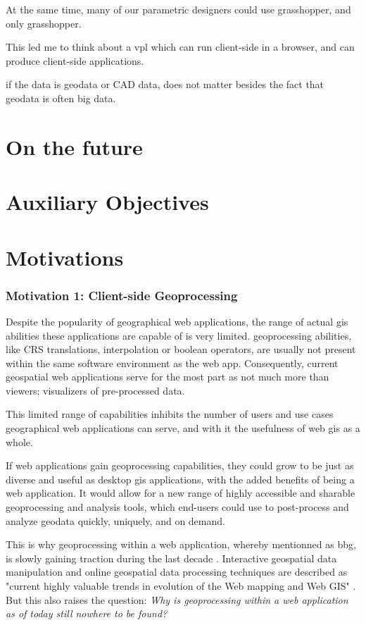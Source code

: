 At the same time, many of our parametric designers could use grasshopper, and only grasshopper. 

This led me to think about a vpl which can run client-side in a browser, and can produce client-side applications.

if the data is geodata or CAD data, does not matter besides the fact that geodata is often big data.


\section{On the future}


\section{Auxiliary Objectives}



\section{Motivations}



\subsubsection{Motivation 1: Client-side Geoprocessing}

Despite the popularity of geographical web applications, the range of actual \ac{gis} abilities these applications are capable of is very limited. \ac{geoprocessing} abilities, like CRS translations, interpolation or boolean operators, are usually not present within the same software environment as the web app. Consequently, current geospatial web applications serve for the most part as not much more than viewers; visualizers of pre-processed data. 

This limited range of capabilities inhibits the number of users and use cases geographical web applications can serve, and with it the usefulness of web \ac{gis} as a whole. 

If web applications gain \ac{geoprocessing} capabilities, they could grow to be just as diverse and useful as desktop \ac{gis} applications, with the added benefits of being a web application. It would allow for a new range of highly accessible and sharable geoprocessing and analysis tools, which end-users could use to post-process and analyze geodata quickly, uniquely, and on demand.

This is why \ac{geoprocessing} within a web application, whereby mentionned as \ac{bbg}, is slowly gaining traction during the last decade \cite{kulawiak_analysis_2019, panidi_hybrid_2015, hamilton_client-side_2014}. Interactive geospatial data manipulation and online geospatial data processing techniques are described as "current highly valuable trends in evolution of the Web mapping and Web GIS" \cite{panidi_hybrid_2015}. But this also raises the question: \textit{Why is geoprocessing within a web application as of today still nowhere to be found?} 


